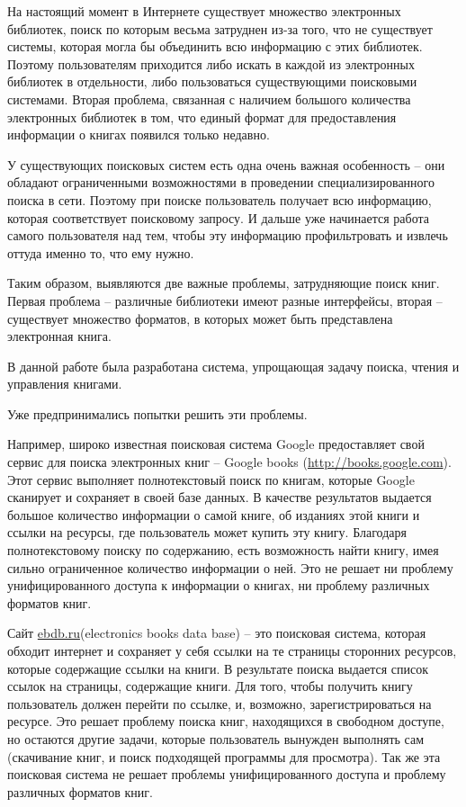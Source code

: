 \documentclass[a4paper]{report}
\begin{document}
На настоящий момент в Интернете существует множество электронных библиотек, поиск по которым весьма затруднен из-за того, что не существует системы, которая могла бы объединить всю информацию с этих библиотек. Поэтому пользователям приходится либо искать в каждой из электронных библиотек в отдельности, либо пользоваться существующими поисковыми системами. Вторая проблема, связанная с наличием большого количества электронных библиотек в том, что единый формат для предоставления информации о книгах появился только недавно. 

У существующих поисковых систем есть одна очень важная особенность -- они обладают ограниченными возможностями в проведении специализированного поиска в сети. Поэтому при поиске пользователь получает всю информацию, которая соответствует поисковому запросу. И дальше уже начинается работа самого пользователя над тем, чтобы эту информацию профильтровать и извлечь оттуда именно то, что ему нужно. 

Таким образом, выявляются две важные проблемы, затрудняющие поиск книг. Первая проблема -- различные библиотеки имеют разные интерфейсы, вторая -- существует множество форматов, в которых может быть представлена электронная книга. 

В данной работе была разработана система, упрощающая задачу поиска, чтения и управления книгами. 



Уже предпринимались попытки решить эти проблемы.

Например, широко известная поисковая система Google предоставляет свой сервис для поиска электронных книг -- Google books (\url{http://books.google.com}). Этот сервис выполняет полнотекстовый поиск по книгам, которые Google сканирует и сохраняет в своей базе данных. В качестве результатов выдается большое количество информации о самой книге, об изданиях этой книги и ссылки на ресурсы, где пользователь может купить эту книгу. Благодаря полнотекстовому поиску  по содержанию, есть возможность найти книгу, имея сильно ограниченное количество информации о ней. Это не решает ни проблему унифицированного доступа к информации о книгах, ни проблему различных форматов книг.

Сайт \url{ebdb.ru}(electronics books data base)  -- это поисковая система, которая обходит интернет и сохраняет у себя ссылки на те страницы сторонних ресурсов, которые содержащие ссылки на книги. В результате поиска выдается список ссылок на страницы, содержащие книги. Для того, чтобы получить книгу пользователь должен перейти по ссылке, и, возможно, зарегистрироваться на ресурсе. Это решает проблему поиска книг, находящихся в свободном доступе, но остаются другие задачи, которые пользователь вынужден выполнять сам (скачивание книг, и поиск подходящей программы для просмотра). Так же эта поисковая система не решает проблемы унифицированного доступа и проблему различных форматов книг.
\end{document}
